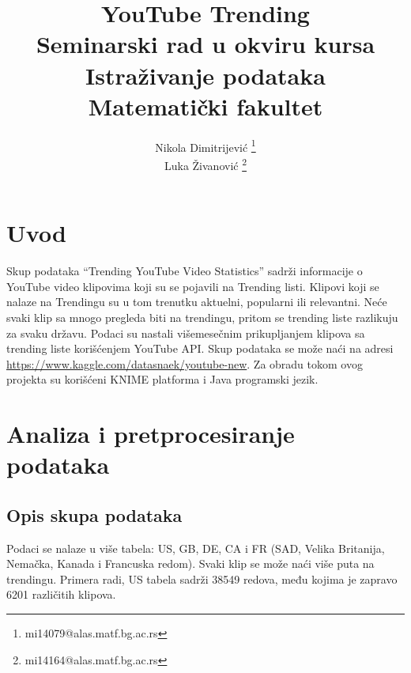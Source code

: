 \documentclass[a4paper]{article}
\theoremstyle{definition}
\begin{document}
\title{YouTube Trending\\ \small{Seminarski rad u okviru kursa\\Istraživanje podataka\\ Matematički fakultet}}

\author{Nikola Dimitrijević \footnote{mi14079@alas.matf.bg.ac.rs}\\
        Luka Živanović \footnote{mi14164@alas.matf.bg.ac.rs}\\
 }
\vspace*{-3cm}
    {\let\newpage\relax\maketitle}

\tableofcontents

\newpage



\section{Uvod}
\label{sec:uvod}
Skup podataka ``Trending YouTube Video Statistics'' sadrži informacije o YouTube video klipovima koji su se pojavili na Trending listi.
Klipovi koji se nalaze na Trendingu su u tom trenutku aktuelni, popularni ili relevantni. Neće svaki klip sa mnogo pregleda biti na trendingu,
 pritom se trending liste razlikuju za svaku državu. Podaci su nastali višemesečnim prikupljanjem klipova sa trending liste korišćenjem YouTube API.
Skup podataka se može naći na adresi \url{https://www.kaggle.com/datasnaek/youtube-new}.
Za obradu tokom ovog projekta su korišćeni KNIME platforma i Java programski jezik.

\section{Analiza i pretprocesiranje podataka}


\label{sec:analiza}

\subsection{Opis skupa podataka}
Podaci se nalaze u više tabela: US, GB, DE,
CA i FR (SAD, Velika Britanija, Nemačka, Kanada i Francuska redom). 
Svaki klip se može naći više puta na trendingu.
Primera radi, US tabela sadrži 38549 redova, među kojima je zapravo  6201 različitih klipova.
\end{document}
